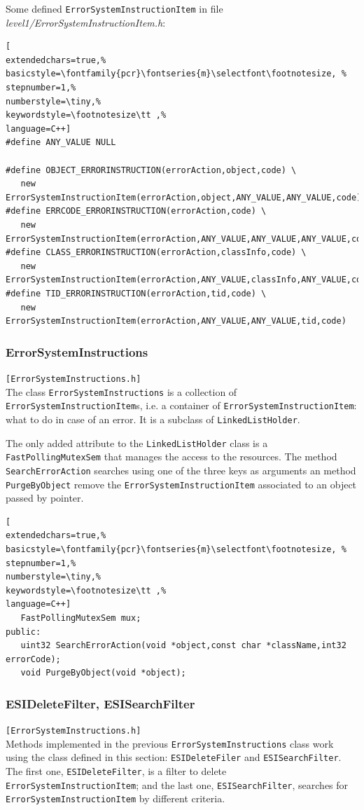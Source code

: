 Some defined \texttt{ErrorSystemInstructionItem} in file \textit{level1/ErrorSystemInstructionItem.h}:
\begin{lstlisting}[
extendedchars=true,%
basicstyle=\fontfamily{pcr}\fontseries{m}\selectfont\footnotesize, %
stepnumber=1,%
numberstyle=\tiny,%
keywordstyle=\footnotesize\tt ,%
language=C++]
#define ANY_VALUE NULL

#define OBJECT_ERRORINSTRUCTION(errorAction,object,code) \
   new ErrorSystemInstructionItem(errorAction,object,ANY_VALUE,ANY_VALUE,code)
#define ERRCODE_ERRORINSTRUCTION(errorAction,code) \
   new ErrorSystemInstructionItem(errorAction,ANY_VALUE,ANY_VALUE,ANY_VALUE,code)
#define CLASS_ERRORINSTRUCTION(errorAction,classInfo,code) \
   new ErrorSystemInstructionItem(errorAction,ANY_VALUE,classInfo,ANY_VALUE,code)
#define TID_ERRORINSTRUCTION(errorAction,tid,code) \
   new ErrorSystemInstructionItem(errorAction,ANY_VALUE,ANY_VALUE,tid,code)
\end{lstlisting}



\subsubsection{ErrorSystemInstructions}
\texttt{[ErrorSystemInstructions.h]}\\
The class \texttt{ErrorSystemInstructions} is a collection of \texttt{ErrorSystemInstructionItem}s, i.e. a container of \texttt{ErrorSystemInstructionItem}: what to do in case of an error. It is a subclass of \texttt{LinkedListHolder}.

The only added attribute to the \texttt{LinkedListHolder} class is a \texttt{FastPollingMutexSem} that manages the access to the resources. The method \texttt{SearchErrorAction} searches using one of the three keys as arguments an method \texttt{PurgeByObject} remove the \texttt{ErrorSystemInstructionItem} associated to an object passed by pointer.
\begin{lstlisting}[
extendedchars=true,%
basicstyle=\fontfamily{pcr}\fontseries{m}\selectfont\footnotesize, %
stepnumber=1,%
numberstyle=\tiny,%
keywordstyle=\footnotesize\tt ,%
language=C++]
   FastPollingMutexSem mux;
public:
   uint32 SearchErrorAction(void *object,const char *className,int32 errorCode);
   void PurgeByObject(void *object);
\end{lstlisting}



\subsubsection{ESIDeleteFilter, ESISearchFilter}
\texttt{[ErrorSystemInstructions.h]}\\
Methods implemented in the previous \texttt{ErrorSystemInstructions} class work using the class defined in this section: \texttt{ESIDeleteFiler} and \texttt{ESISearchFilter}. The first one, \texttt{ESIDeleteFilter}, is a filter to delete \texttt{ErrorSystemInstructionItem}; and the last one, \texttt{ESISearchFilter}, searches for \texttt{ErrorSystemInstructionItem} by different criteria.



